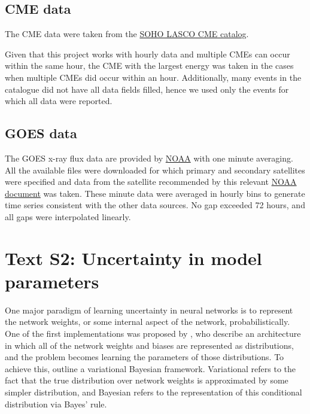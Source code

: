 \documentclass{agujournal2018}
\begin{document}
\subsection*{CME data}
The CME data were taken from the \href{https://cdaw.gsfc.nasa.gov/CME_list/}{SOHO LASCO CME catalog}.

Given that this project works with hourly data and multiple CMEs can occur within the same hour, the CME with the largest energy was taken in the cases when multiple CMEs did occur within an hour. Additionally, many events in the catalogue did not have all data fields filled, hence we used only the events for which all data were reported.

\subsection*{GOES data}\label{sec:GOESsupp}

The GOES x-ray flux data are provided by \href{https://satdat.ngdc.noaa.gov/sem/goes/data/avg}{NOAA} with one minute averaging. All the available files were downloaded for which primary and secondary satellites were specified and data from the satellite recommended by this relevant \href{https://www.ngdc.noaa.gov/stp/satellite/goes/doc/GOES\_XRS\_readme.pdf}{NOAA document} was taken. These minute data were averaged in hourly bins to generate time series consistent with the other data sources. No gap exceeded 72 hours, and all gaps were interpolated linearly.

\section*{Text S2: Uncertainty in model parameters}\label{sec:variational_intro}
One major paradigm of learning uncertainty in neural networks is to represent the network weights, or some internal aspect of the network, probabilistically. One of the first implementations was proposed by \cite{Blundell2015}, who describe an architecture in which all of the network weights and biases are represented as distributions, and the problem becomes learning the parameters of those distributions. To achieve this, \cite{Blundell2015} outline a variational Bayesian framework. Variational refers to the fact that the true distribution over network weights is approximated by some simpler distribution, and Bayesian refers to the representation of this conditional distribution via Bayes' rule.
\end{document}
